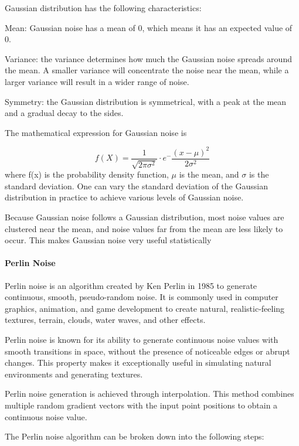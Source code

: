 \documentclass[runningheads,a4paper]{llncs}
\begin{document}
Gaussian distribution has the following characteristics:

Mean: Gaussian noise has a mean of 0, which means it has an expected value of 0.

Variance: the variance determines how much the Gaussian noise spreads around the mean. 
A smaller variance will concentrate the noise near the mean, while a larger variance will result in a wider range of noise.

Symmetry: the Gaussian distribution is symmetrical, with a peak at the mean and a gradual decay to the sides.

The mathematical expression for Gaussian noise is

\begin{equation}
f(X) = \frac{1}{\sqrt{2\pi\sigma^2}}\cdot e^-\frac{(x-\mu)^2}{2\sigma^2}
\end{equation}
where f(x) is the probability density function, $\mu$ is the mean, and $\sigma$ is the standard deviation.
One can vary the standard deviation of the Gaussian distribution in practice to achieve various levels of Gaussian noise.

Because Gaussian noise follows a Gaussian distribution, most noise values are clustered near the mean, and noise values far from the mean are less likely to occur. This makes Gaussian noise very useful statistically

\paragraph{Perlin Noise}
Perlin noise is an algorithm created by Ken Perlin in 1985 to generate continuous, smooth, pseudo-random noise\cite{perlin1985image}. It is commonly used in computer graphics, animation, and game development to create natural, realistic-feeling textures, terrain, clouds, water waves, and other effects\cite{green2005implementing}.

Perlin noise is known for its ability to generate continuous noise values with smooth transitions in space, without the presence of noticeable edges or abrupt changes. This property makes it exceptionally useful in simulating natural environments and generating textures\cite{perlin1985image}.

Perlin noise generation is achieved through interpolation. This method combines multiple random gradient vectors with the input point positions to obtain a continuous noise value\cite{green2005implementing}. 

The Perlin noise algorithm can be broken down into the following steps:
\end{document}
